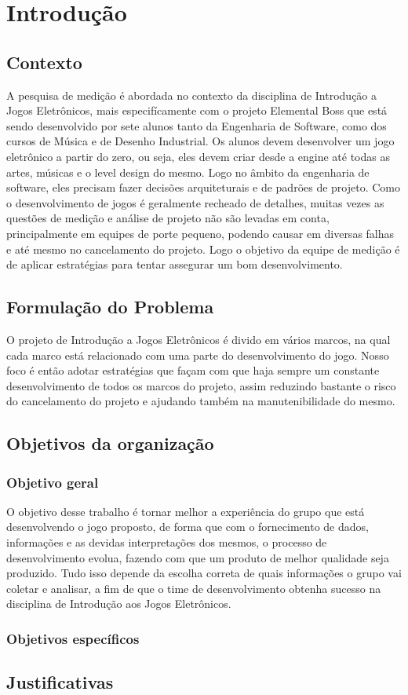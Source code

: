 \chapter{Introdução}

\section{Contexto}
	
	A pesquisa de medição é abordada no contexto da disciplina de Introdução a Jogos Eletrônicos, mais especifícamente com o projeto Elemental Boss que está sendo desenvolvido por sete alunos tanto da Engenharia de Software, como dos cursos de Música e de Desenho Industrial. Os alunos devem desenvolver um jogo eletrônico a partir do zero, ou seja, eles devem criar desde a engine até todas as artes, músicas e o level design do mesmo. Logo no âmbito da engenharia de software, eles precisam fazer decisões arquiteturais e de padrões de projeto.
	Como o desenvolvimento de jogos é geralmente recheado de detalhes, muitas vezes as questões de medição e análise de projeto não são levadas em conta, principalmente em equipes de porte pequeno, podendo causar em diversas falhas e até mesmo no cancelamento do projeto. Logo o objetivo da equipe de medição é de aplicar estratégias para tentar assegurar um bom desenvolvimento.

\section{Formulação do Problema}

	O projeto de Introdução a Jogos Eletrônicos é divido em vários marcos, na qual cada marco está relacionado com uma parte do desenvolvimento do jogo. Nosso foco é então adotar estratégias que façam com que haja sempre um constante desenvolvimento de todos os marcos do projeto, assim reduzindo bastante o risco do cancelamento do projeto e ajudando também na manutenibilidade do mesmo.

\section{Objetivos da organização}

\subsection{Objetivo geral}
	O objetivo desse trabalho é tornar melhor a experiência do grupo que está desenvolvendo o jogo proposto, de forma que com o fornecimento de dados, informações e as devidas interpretações dos mesmos, o processo de desenvolvimento evolua, fazendo com que um produto de melhor qualidade seja produzido. Tudo isso depende da escolha correta de quais informações o grupo vai coletar e analisar, a fim de que o time de desenvolvimento obtenha sucesso na disciplina de Introdução aos Jogos Eletrônicos.

\subsection{Objetivos específicos}


\section{Justificativas}
  
